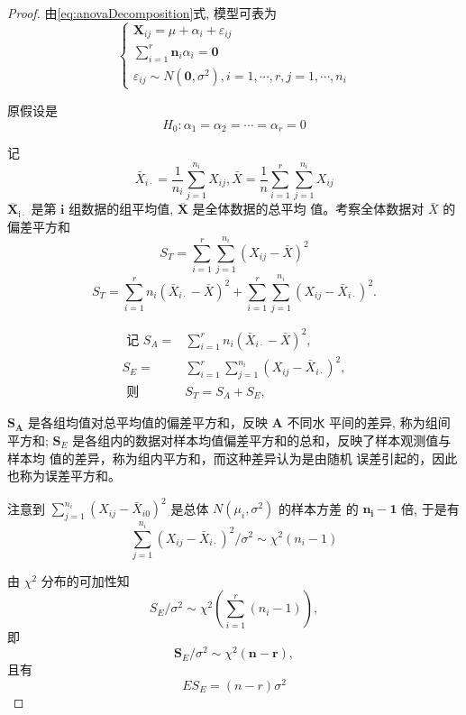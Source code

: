 \begin{proof}
    由\cref{eq:anovaDecomposition}式, 模型可表为
    $$
    \left\{\begin{array}{l}
    \boldsymbol{X}_{i j}=\mu+\alpha_{i}+\varepsilon_{i j} \\
    \sum_{i=1}^{r} \boldsymbol{n}_{i} \alpha_{i}=\mathbf{0} \\
    \varepsilon_{i j} \sim N\left(\mathbf{0}, \sigma^{2}\right), i=1, \cdots, r, j=1, \cdots, n_{i}
    \end{array}\right.
    $$
    
    原假设是
    $$
    H_{0}: \alpha_{1}=\alpha_{2}=\cdots=\alpha_{r}=0
    $$
    
    记
    $$
    \bar{X}_{i \cdot}=\frac{1}{n_{i}} \sum_{j=1}^{n_{i}} X_{i j}, \bar{X}=\frac{1}{n} \sum_{i=1}^{r} \sum_{j=1}^{n_{i}} X_{i j}
    $$
    \( \overline{\boldsymbol{X}}_{\mathrm{i} \cdot} \) 是第 \( \boldsymbol{i} \) 组数据的组平均值, \( \overline{\boldsymbol{X}} \) 是全体数据的总平均
    值。考察全体数据对 \( \bar{X} \) 的偏差平方和
    $$
    S_{T}=\sum_{i=1}^{r} \sum_{j=1}^{n_{i}}\left(X_{i j}-\bar{X}\right)^{2}
    $$
    $$
    S_{T}=\sum_{i=1}^{r} n_{i}\left(\bar{X}_{i \cdot}-\bar{X}\right)^{2}+\sum_{i=1}^{r} \sum_{j=1}^{n_{i}}\left(X_{i j}-\bar{X}_{i \cdot}\right)^{2} .
    $$
    
    $$ \begin{aligned} \text { 记 } S_{A}=& \sum_{i=1}^{r} n_{i}\left(\bar{X}_{i \cdot}-\bar{X}\right)^{2}, \\ S_{E}=& \sum_{i=1}^{r} \sum_{j=1}^{n_{i}}\left(X_{i j}-\bar{X}_{i \cdot}\right)^{2}, \\ \text { 则 } & S_{T}=S_{A}+S_{E}, \end{aligned} $$
    
    \( \boldsymbol{S}_{\boldsymbol{A}} \) 是各组均值对总平均值的偏差平方和，反映 \( \boldsymbol{A} \) 不同水
    平间的差异, 称为组间平方和; \( \boldsymbol{S}_{E} \) 是各组内的数据对样本均值偏差平方和的总和，反映了样本观测值与样本均
    值的差异，称为组内平方和，而这种差异认为是由随机
    误差引起的，因此也称为误差平方和。
    
    注意到 \( \sum_{j=1}^{n_{i}}\left(X_{i j}-\bar{X}_{i 0}\right)^{2} \) 是总体 \( N\left(\mu_{i}, \sigma^{2}\right) \) 的样本方差
    的 \( \boldsymbol{n}_{\boldsymbol{i}}-\mathbf{1} \) 倍, 于是有
    $$
    \sum_{j=1}^{n_{i}}\left(X_{i j}-\bar{X}_{i \cdot}\right)^{2} / \sigma^{2} \sim \chi^{2}\left(n_{i}-1\right)
    $$
    
    由 \( \chi^{2} \) 分布的可加性知
    $$
    S_{E} / \sigma^{2} \sim \chi^{2}\left(\sum_{i=1}^{r}\left(n_{i}-1\right)\right),
    $$
    即
    $$
    \boldsymbol{S}_{E} / \sigma^{2} \sim \chi^{2}(\boldsymbol{n}-\boldsymbol{r}),
    $$
    且有
    $$
    E S_{E}=(n-r) \sigma^{2}
    $$
    

\end{proof}
